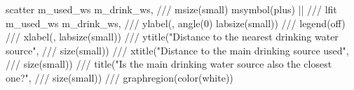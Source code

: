scatter m_used_ws m_drink_ws, ///
        msize(small) msymbol(plus) || ///
lfit m_used_ws m_drink_ws, ///
        ylabel(, angle(0) labsize(small)) ///
legend(off) ///
xlabel(, labsize(small)) ///
ytitle("Distance to the nearest drinking water source", ///
           size(small)) ///
xtitle("Distance to the main drinking source used", ///
           size(small)) ///
title("Is the main drinking water source also the closest one?", ///
          size(small)) ///
graphregion(color(white))                                                       
